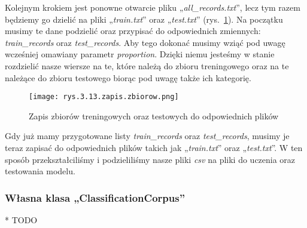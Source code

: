 Kolejnym krokiem jest ponowne otwarcie pliku „\emph{all\_records.txt}”, lecz tym razem będziemy go dzielić na pliki „\emph{train.txt}” oraz „\emph{test.txt}” (rys.~\ref{fig:3.12}). Na początku musimy te dane podzielić oraz przypisać do odpowiednich zmiennych: \emph{train\_records} oraz \emph{test\_records}. Aby tego dokonać musimy wziąć pod uwagę wcześniej omawiany parametr \emph{proportion}. Dzięki niemu jesteśmy w stanie rozdzielić nasze wiersze na te, które należą do zbioru treningowego oraz na te należące do zbioru testowego biorąc pod uwagę także ich kategorię.
\begin{figure}[h]
    \centering
    \texttt{[image: rys.3.13.zapis.zbiorow.png]}
    \caption{Zapis zbiorów treningowych oraz testowych do odpowiednich plików}
    \label{fig:3.12}
\end{figure}

Gdy już mamy przygotowane listy \emph{train\_records} oraz \emph{test\_records}, musimy je teraz zapisać do odpowiednich plików takich jak „\emph{train.txt}” oraz „\emph{test.txt}”. W ten sposób przekształciliśmy i podzieliliśmy nasze pliki \emph{csv} na pliki do uczenia oraz testowania modelu.


\subsubsection{Własna klasa „ClassificationCorpus”}
\label{sec:3.2.2.2}

* TODO







